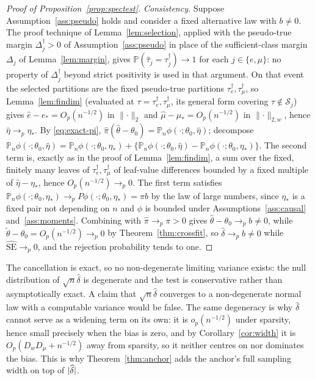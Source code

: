 \documentclass[11pt]{article}
\theoremstyle{plain}
\theoremstyle{definition}
\theoremstyle{remark}
\newcommand{\PP}{\mathbb{P}}
\newcommand{\Pn}{\mathbb{P}_n}
\newcommand{\cS}{\mathcal{S}}
\newcommand{\ehat}{\widehat{e}}
\newcommand{\mhat}{\widehat{\mu}}
\newcommand{\that}{\widehat{\tau}}
\newcommand{\thetahat}{\widehat{\theta}}
\newcommand{\thetatil}{\widetilde{\theta}}
\newcommand{\pihat}{\widehat{\pi}}
\newcommand{\Dw}{D_w}
\newcommand{\Dm}{D_\mu}
\newcommand{\Ltwo}[1]{\lVert #1 \rVert_{2}}
\newcommand{\Lw}[1]{\lVert #1 \rVert_{2,w}}
\DeclarePairedDelimiter{\abs}{\lvert}{\rvert}
\begin{document}
\begin{proof}[Proof of Proposition~\ref{prop:spectest}]
\emph{Consistency.} Suppose Assumption~\ref{ass:pseudo} holds and consider a
fixed alternative law with $b\ne0$. The proof technique of
Lemma~\ref{lem:selection}, applied with the pseudo-true margin
$\Delta_j^\dagger>0$ of Assumption~\ref{ass:pseudo} in place of the
sufficient-class margin $\Delta_j$ of Lemma~\ref{lem:margin}, gives
$\PP(\that_j=\tau_j^\dagger)\to1$ for each $j\in\{e,\mu\}$: no property of
$\Delta_j^\dagger$ beyond strict positivity is used in that argument. On that
event the selected partitions are the fixed pseudo-true partitions
$\tau_e^\dagger,\tau_\mu^\dagger$, so Lemma~\ref{lem:findim} (evaluated at
$\tau=\tau_e^\dagger,\tau_\mu^\dagger$, its general form covering
$\tau\notin\cS_j$) gives $\ehat-e_*=O_p(n^{-1/2})$ in $\Ltwo\cdot$ and
$\mhat-\mu_*=O_p(n^{-1/2})$ in $\Lw\cdot$, hence $\widehat\eta\to_p\eta_*$. By
\eqref{eq:exact-pi}, $\pihat(\thetahat-\theta_0)=\Pn\phi(\cdot;\theta_0,\widehat\eta)$;
decompose
$\Pn\phi(\cdot;\theta_0,\widehat\eta)=\Pn\phi(\cdot;\theta_0,\eta_*)
+\{\Pn\phi(\cdot;\theta_0,\widehat\eta)-\Pn\phi(\cdot;\theta_0,\eta_*)\}$. The
second term is, exactly as in the proof of Lemma~\ref{lem:findim}, a sum over
the fixed, finitely many leaves of $\tau_e^\dagger,\tau_\mu^\dagger$ of
leaf-value differences bounded by a fixed multiple of $\widehat\eta-\eta_*$, hence
$O_p(n^{-1/2})\to_p0$. The first term satisfies
$\Pn\phi(\cdot;\theta_0,\eta_*)\to_pP\phi(\cdot;\theta_0,\eta_*)=\pi b$ by
the law of large numbers, since $\eta_*$ is a fixed pair not depending on $n$
and $\phi$ is bounded under Assumptions~\ref{ass:causal}
and~\ref{ass:moments}. Combining with $\pihat\to_p\pi>0$ gives
$\thetahat-\theta_0\to_pb\ne0$, while $\thetatil-\theta_0=O_p(n^{-1/2})\to_p0$
by Theorem~\ref{thm:crossfit}, so $\widehat\delta\to_pb\ne0$ while
$\widehat{\mathrm{SE}}\to_p0$, and the rejection probability tends to one.
\end{proof}

\noindent The cancellation is exact, so no non-degenerate limiting variance
exists: the null distribution of $\sqrt n\widehat\delta$ is degenerate and the
test is conservative rather than asymptotically exact. A claim that
$\sqrt n\widehat\delta$ converges to a non-degenerate normal law with a
computable variance would be false. The same degeneracy is why
$\widehat\delta$ cannot serve as a widening term on its own: it is $o_p(n^{-1/2})$
under sparsity, hence small precisely when the bias is zero, and by
Corollary~\ref{cor:width} it is $O_p(\Dw\Dm+n^{-1/2})$ away from
sparsity, so it neither centres on nor dominates the bias. This is why
Theorem~\ref{thm:anchor} adds the anchor's full sampling width on top of
$\abs{\widehat\delta}$.
\end{document}
